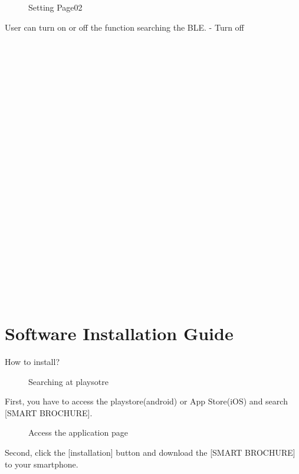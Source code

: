 \documentclass[conference]{IEEEtran}
\begin{document}
\begin{figure}[htbp]
\begin{center}
    \caption{Setting Page02} 
\end{center}
\end{figure}

User can turn on or off the function searching the BLE. - Turn off\\\\\\\\\\\\\\\\\\\\\\\\\\\\\\\\\\\\\\\\\\\\\\\


\section{Software Installation Guide\\}
 How to install?

\begin{figure}[htbp]
\begin{center}
    \caption{Searching at playsotre} 
\end{center}
\end{figure}

First, you have to access the playstore(android) or App Store(iOS) and search [SMART BROCHURE]. \\

\begin{figure}[htbp]
\begin{center}
    \caption{Access the application page} 
\end{center}
\end{figure}

Second, click the [installation] button and download the [SMART BROCHURE] to your smartphone.\\
\end{document}
